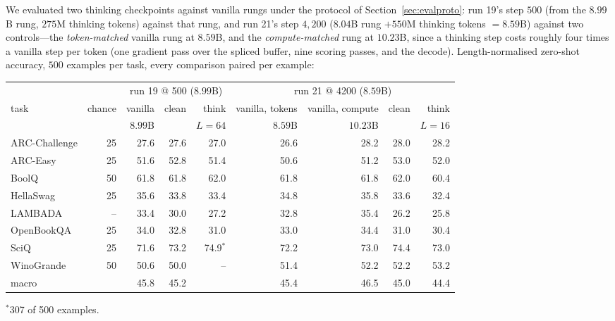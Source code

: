 \documentclass{article} %
\begin{document}
We evaluated two thinking checkpoints against vanilla rungs under the protocol of Section~\ref{sec:evalproto}: run 19's step $500$ (from the $8.99$B rung, $275$M thinking tokens) against that rung, and run 21's step $4{,}200$ ($8.04$B rung $+ 550$M thinking tokens $= 8.59$B) against two controls---the \emph{token-matched} vanilla rung at $8.59$B, and the \emph{compute-matched} rung at $10.23$B, since a thinking step costs roughly four times a vanilla step per token (one gradient pass over the spliced buffer, nine scoring passes, and the decode). Length-normalised zero-shot accuracy, $500$ examples per task, every comparison paired per example:
\begin{center}\small
\begin{tabular}{lr@{\hskip 10pt}rrr@{\hskip 12pt}rrrr}
\toprule
 & & \multicolumn{3}{c}{run 19 @ 500 ($8.99$B)} & \multicolumn{4}{c}{run 21 @ 4200 ($8.59$B)} \\
\cmidrule(lr){3-5}\cmidrule(lr){6-9}
task & chance & vanilla & clean & think & vanilla, tokens & vanilla, compute & clean & think \\
 & & $8.99$B & & $L{=}64$ & $8.59$B & $10.23$B & & $L{=}16$ \\
\midrule
ARC-Challenge & 25 & 27.6 & 27.6 & 27.0 & 26.6 & 28.2 & 28.0 & 28.2 \\
ARC-Easy      & 25 & 51.6 & 52.8 & 51.4 & 50.6 & 51.2 & 53.0 & 52.0 \\
BoolQ         & 50 & 61.8 & 61.8 & 62.0 & 61.8 & 61.8 & 62.0 & 60.4 \\
HellaSwag     & 25 & 35.6 & 33.8 & 33.4 & 34.8 & 35.8 & 33.6 & 32.4 \\
LAMBADA       & -- & 33.4 & 30.0 & 27.2 & 32.8 & 35.4 & 26.2 & 25.8 \\
OpenBookQA    & 25 & 34.0 & 32.8 & 31.0 & 33.0 & 34.4 & 31.0 & 30.4 \\
SciQ          & 25 & 71.6 & 73.2 & 74.9$^{*}$ & 72.2 & 73.0 & 74.4 & 73.0 \\
WinoGrande    & 50 & 50.6 & 50.0 & -- & 51.4 & 52.2 & 52.2 & 53.2 \\
\midrule
macro         &    & 45.8 & 45.2 & & 45.4 & 46.5 & 45.0 & 44.4 \\
\bottomrule
\end{tabular}
\end{center}
{\small $^{*}$307 of 500 examples.}
\end{document}
